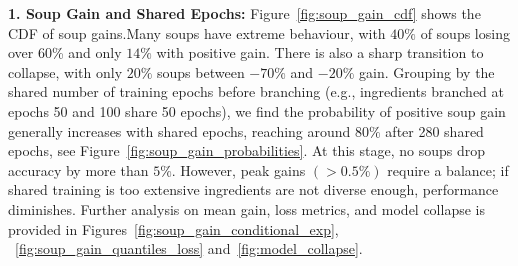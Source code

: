 


\textbf{1. Soup Gain and Shared Epochs:} Figure~\ref{fig:soup_gain_cdf} shows the CDF of soup gains.Many soups have extreme behaviour, with $40\%$ of soups losing over 60\% and only $14\%$ with positive gain. There is also a sharp transition to collapse, with only $20\%$ soups between $-70\%$ and $-20\%$ gain. Grouping by the shared number of training epochs before branching (e.g., ingredients branched at epochs 50 and 100 share 50 epochs), we find the probability of positive soup gain generally increases with shared epochs, reaching around $80\%$ after 280 shared epochs, see Figure~\ref{fig:soup_gain_probabilities}. At this stage, no soups drop accuracy by more than $5\%$. However, peak gains $(>0.5\%)$ require a balance; if shared training is too extensive ingredients are not diverse enough, performance diminishes. Further analysis on mean gain, loss metrics, and model collapse is provided in Figures~\ref{fig:soup_gain_conditional_exp}, ~\ref{fig:soup_gain_quantiles_loss} and~\ref{fig:model_collapse}.
 
